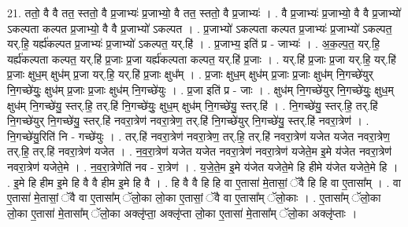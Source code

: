 \documentclass[17pt]{extarticle}
\begin{document}
21. ततो॒ वै वै तत॒ स्ततो॒ वै प्र॒जाभ्यः॑ प्र॒जाभ्यो॒ वै तत॒ स्ततो॒ वै प्र॒जाभ्यः॑ । . वै प्र॒जाभ्यः॑ प्र॒जाभ्यो॒ वै वै प्र॒जाभ्यो॑ ऽकल्पता कल्पत प्र॒जाभ्यो॒ वै वै प्र॒जाभ्यो॑ ऽकल्पत । . प्र॒जाभ्यो॑ ऽकल्पता कल्पत प्र॒जाभ्यः॑ प्र॒जाभ्यो॑ ऽकल्पत॒ यर्.हि॒ यर्ह्य॑कल्पत प्र॒जाभ्यः॑ प्र॒जाभ्यो॑ ऽकल्पत॒ यर्.हि॑ । . प्र॒जाभ्य॒ इति॑ प्र - जाभ्यः॑ । . अ॒क॒ल्प॒त॒ यर्.हि॒ यर्ह्य॑कल्पता कल्पत॒ यर्.हि॑ प्र॒जाः प्र॒जा यर्ह्य॑कल्पता कल्पत॒ यर्.हि॑ प्र॒जाः । . यर्.हि॑ प्र॒जाः प्र॒जा यर्.हि॒ यर्.हि॑ प्र॒जाः क्षुध॒म् क्षुध॑म् प्र॒जा यर्.हि॒ यर्.हि॑ प्र॒जाः क्षुध᳚म् । . प्र॒जाः क्षुध॒म् क्षुध॑म् प्र॒जाः प्र॒जाः क्षुध॑म् नि॒गच्छे॑युर् नि॒गच्छे॑युः॒ क्षुध॑म् प्र॒जाः प्र॒जाः क्षुध॑म् नि॒गच्छे॑युः । . प्र॒जा इति॑ प्र - जाः । . क्षुध॑म् नि॒गच्छे॑युर् नि॒गच्छे॑युः॒ क्षुध॒म् क्षुध॑म् नि॒गच्छे॑यु॒ स्तर्.हि॒ तर्.हि॑ नि॒गच्छे॑युः॒ क्षुध॒म् क्षुध॑म् नि॒गच्छे॑यु॒ स्तर्.हि॑ । . नि॒गच्छे॑यु॒ स्तर्.हि॒ तर्.हि॑ नि॒गच्छे॑युर् नि॒गच्छे॑यु॒ स्तर्.हि॑ नवरा॒त्रेण॑ नवरा॒त्रेण॒ तर्.हि॑ नि॒गच्छे॑युर् नि॒गच्छे॑यु॒ स्तर्.हि॑ नवरा॒त्रेण॑ । . नि॒गच्छे॑यु॒रिति॑ नि - गच्छे॑युः । . तर्.हि॑ नवरा॒त्रेण॑ नवरा॒त्रेण॒ तर्.हि॒ तर्.हि॑ नवरा॒त्रेण॑ यजेत यजेत नवरा॒त्रेण॒ तर्.हि॒ तर्.हि॑ नवरा॒त्रेण॑ यजेत । . न॒व॒रा॒त्रेण॑ यजेत यजेत नवरा॒त्रेण॑ नवरा॒त्रेण॑ यजेते॒म इ॒मे य॑जेत नवरा॒त्रेण॑ नवरा॒त्रेण॑ 
यजेते॒मे । . न॒व॒रा॒त्रेणेति॑ नव - रा॒त्रेण॑ । . य॒जे॒ते॒म इ॒मे य॑जेत यजेते॒मे हि हीमे य॑जेत यजेते॒मे हि । . इ॒मे हि हीम इ॒मे हि वै वै हीम इ॒मे हि वै । . हि वै वै हि हि वा ए॒तासा॑ मे॒तासां॒ ॅवै हि हि वा ए॒तासा᳚म् । . वा ए॒तासा॑ मे॒तासां॒ ॅवै वा ए॒तासा᳚म् ॅलो॒का लो॒का ए॒तासां॒ ॅवै वा ए॒तासा᳚म् ॅलो॒काः । . ए॒तासा᳚म् ॅलो॒का लो॒का ए॒तासा॑ मे॒तासा᳚म् ॅलो॒का अक्लृ॑प्ता॒ अक्लृ॑प्ता लो॒का ए॒तासा॑ मे॒तासा᳚म् ॅलो॒का अक्लृ॑प्ताः । \newline
\end{document}
